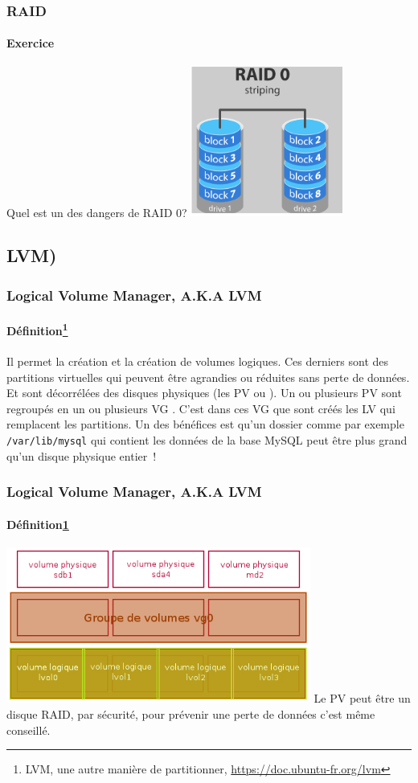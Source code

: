 \documentclass{beamer}
\begin{document}
    \begin{frame}
        \transdissolve
        \frametitle{RAID}
        \framesubtitle{Exercice \execcounterdispinc{}}
        Quel est un des dangers de RAID 0?
        \bigbreak
        \centering
        \includegraphics[width=5cm]{image/raid-0}
    \end{frame}

    \subsection{LVM)}\label{subsec:lvm}

    \begin{frame}
        \transdissolve
        \frametitle{Logical Volume Manager, A.K.A LVM}
        \framesubtitle{Définition\footnote{\label{lvm}LVM, une autre manière de partitionner, \url{https://doc.ubuntu-fr.org/lvm}}}
        Il permet la création et la création de volumes logiques.
        Ces derniers sont des partitions virtuelles qui peuvent être agrandies ou réduites sans perte de données.
        Et sont décorrélées des disques physiques (les PV ou ).
        \bigbreak
        Un ou plusieurs PV sont regroupés en un ou plusieurs VG .
        \bigbreak
        C'est dans ces VG que sont créés les LV  qui remplacent les partitions.
        \bigbreak
        Un des bénéfices est qu'un dossier comme par exemple \lstinline{/var/lib/mysql} qui contient les données de la base MySQL peut être plus grand qu'un disque physique entier~!
    \end{frame}

    \begin{frame}
        \transdissolve
        \frametitle{Logical Volume Manager, A.K.A LVM}
        \framesubtitle{Définition\cref{lvm}}
        \centering
        \includegraphics[width=10cm]{image/lvm}
        \flushleft
        Le PV peut être un disque RAID, par sécurité, pour prévenir une perte de données c'est même conseillé.
    \end{frame}
\end{document}
